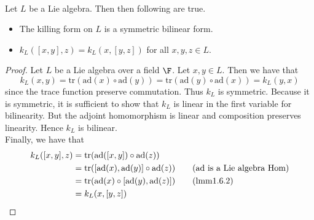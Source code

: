 \documentclass[a4paper]{article}
\begin{document}
\begin{lmm}{}{} \\Let $L$ be a Lie algebra. Then then following are true. 
\begin{itemize}
\item The killing form on $L$ is a symmetric bilinear form. 
\item $k_L([x,y],z)=k_L(x,[y,z])$ for all $x,y,z\in L$. 
\end{itemize} 
\begin{proof}
Let $L$ be a Lie algebra over a field $\F$. Let $x,y\in L$. Then we have that $$k_L(x,y)=\text{tr}(\text{ad}(x)\circ\text{ad}(y))=\text{tr}(\text{ad}(y)\circ\text{ad}(x))=k_L(y,x)$$ since the trace function preserve commutation. Thus $k_L$ is symmetric. Because it is symmetric, it is sufficient to show that $k_L$ is linear in the first variable for bilinearity. But the adjoint homomorphism is linear and composition preserves linearity. Hence $k_L$ is bilinear. \\

Finally, we have that 
\begin{align*}
k_L([x,y],z)&=\text{tr}(\text{ad}([x,y])\circ\text{ad}(z))\\
&=\text{tr}([\text{ad}(x),\text{ad}(y)]\circ\text{ad}(z))\tag{$\text{ad}$ is a Lie algebra Hom}\\
&=\text{tr}(\text{ad}(x)\circ[\text{ad}(y),\text{ad}(z)])\tag{lmm1.6.2}\\
&=k_L(x,[y,z])
\end{align*}
\end{proof}
\end{lmm}
\end{document}
